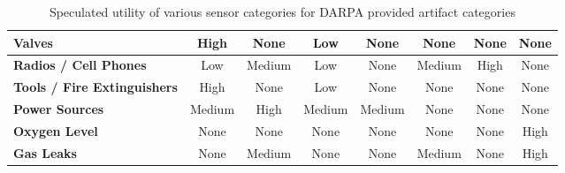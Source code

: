 \begin{table}[]
{\begin{tabular}{lccccccc}
			\textbf{Valves}                     & High                                                          & None                                                              & Low                                                             & None           & None                   & None                                                                         & None                                    \\ \hline
			\textbf{Radios / Cell Phones}       & Low                                                           & Medium                                                            & Low                                                             & None           & Medium                 & High                                                                         & None                                    \\ \hline
			\textbf{Tools / Fire Extinguishers} & High                                                          & None                                                              & Low                                                             & None           & None                   & None                                                                         & None                                    \\ \hline
			\textbf{Power Sources}              & Medium                                                        & High                                                              & Medium                                                          & Medium         & None                   & None                                                                         & None                                    \\ \hline
			\textbf{Oxygen Level}               & None                                                          & None                                                              & None                                                            & None           & None                   & None                                                                         & High                                    \\ \hline
			\textbf{Gas Leaks}                  & None                                                          & Medium                                                            & None                                                            & None           & Medium                 & None                                                                         & High                                    \\ \hline
		\end{tabular}%
	}
	\caption{Speculated utility of various sensor categories for DARPA provided artifact categories}
	\label{sensor_utility_categories}
\end{table}

